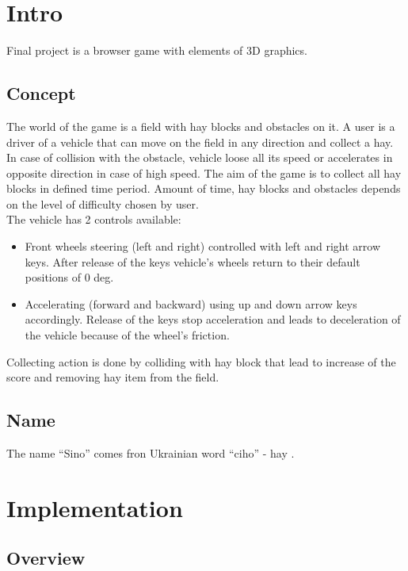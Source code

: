 \documentclass[12pt]{article}
\begin{document}

\tableofcontents
\pagebreak

\section{Intro}
Final project is a browser game with elements of 3D graphics.
\subsection{Concept}
The world of the game is a field with hay blocks and obstacles on it. A user is a driver of a vehicle that can move on the field in any direction and collect a hay. In case of collision with the obstacle, vehicle loose all its speed or accelerates in opposite direction in case of high speed. The aim of the game is to collect all hay blocks in defined time period.  Amount of time, hay blocks and obstacles depends on the level of difficulty chosen by user. 
\\
The vehicle has 2 controls available:
\begin{itemize}
\item {
Front wheels steering (left and right) controlled with left and right arrow keys. After release of the keys vehicle's wheels return to their default positions of 0 deg.
}
\item {
Accelerating (forward and backward) using up and down arrow keys accordingly. Release of the keys stop acceleration and leads to deceleration of the vehicle because of the wheel's friction.
}
\end{itemize}
Collecting action is done by colliding with hay block that lead to increase of the score and removing hay item from the field.
\subsection{Name}
The name ``Sino'' comes fron Ukrainian word ``ciho'' - hay \cite{wiki:sino}.

\newpage
\section{Implementation}
\subsection{Overview}
\end{document}
